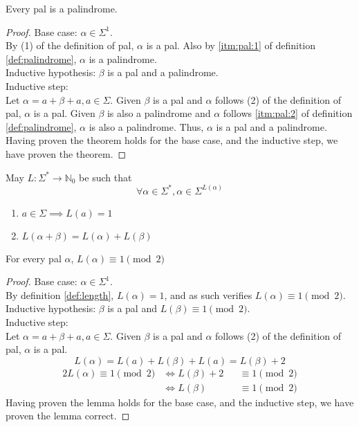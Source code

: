 \documentclass[docid=TP01]{tcom_TP}
\begin{document}
\begin{theorem}
Every pal is a palindrome.
\end{theorem}
\begin{proof}
Base case: $\alpha\in\Sigma^1$.\\
By (1) of the definition of pal, $\alpha$ is a pal. Also by \eqref{itm:pal:1} of definition \ref{def:palindrome}, $\alpha$ is a palindrome.\\
Inductive hypothesis: $\beta$ is a pal and a palindrome.\\
Inductive step:\\
Let $\alpha=a+\beta+a, a\in\Sigma$. Given $\beta$ is a pal and $\alpha$ follows (2) of the definition of pal, $\alpha$ is a pal. Given $\beta$ is also a palindrome and $\alpha$ follows \eqref{itm:pal:2} of definition \ref{def:palindrome}, $\alpha$ is also a palindrome. Thus, $\alpha$ is a pal and a palindrome.\\
Having proven the theorem holds for the base case, and the inductive step, we have proven the theorem.
\end{proof}
\begin{definition}
\label{def:length}
	May $L\colon\Sigma^*\rightarrow\mathbb{N}_0$ be such that
	\begin{equation*}
		\forall\alpha\in\Sigma^*, \alpha\in\Sigma^{L(\alpha)}
	\end{equation*}
\end{definition}
\begin{enumerate}[label=Property \arabic*.,itemindent=*]
	\item $a\in\Sigma \implies L(a)=1$
	\item $L(\alpha+\beta)=L(\alpha)+L(\beta)$
\end{enumerate}
\begin{lemma}
\label{lem:palodd}
	For every pal $\alpha$, $L(\alpha) \equiv 1 \pmod{2}$
\end{lemma}
\begin{proof}
Base case: $\alpha\in\Sigma^1$.\\
By definition \ref{def:length}, $L(\alpha)=1$, and as such verifies $L(\alpha) \equiv 1 \pmod{2}$.\\
Inductive hypothesis: $\beta$ is a pal and $L(\beta) \equiv 1 \pmod{2}$.\\
Inductive step:\\
Let $\alpha=a+\beta+a, a\in\Sigma$. Given $\beta$ is a pal and $\alpha$ follows (2) of the definition of pal, $\alpha$ is a pal.
\begin{equation*}
	L(\alpha)=L(a)+L(\beta)+L(a)=L(\beta)+2
\end{equation*}
\begin{alignat*}{2}
	L(\alpha) \equiv 1 \pmod{2} &\iff L(\beta)+2 &&\equiv 1 \pmod{2} \\
		                        &\iff L(\beta)   &&\equiv 1 \pmod{2}
\end{alignat*}
Having proven the lemma holds for the base case, and the inductive step, we have proven the lemma correct.
\end{proof}
\end{document}
